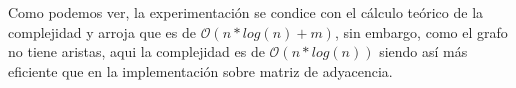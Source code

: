 Como podemos ver, la experimentación se condice con el cálculo teórico de la complejidad y arroja que es de $\mathcal{O}(n*log(n) + m)$, sin embargo, como el grafo no tiene aristas, aqui la complejidad es de $\mathcal{O}(n*log(n))$ siendo así más eficiente que en la implementación sobre matriz de adyacencia.







